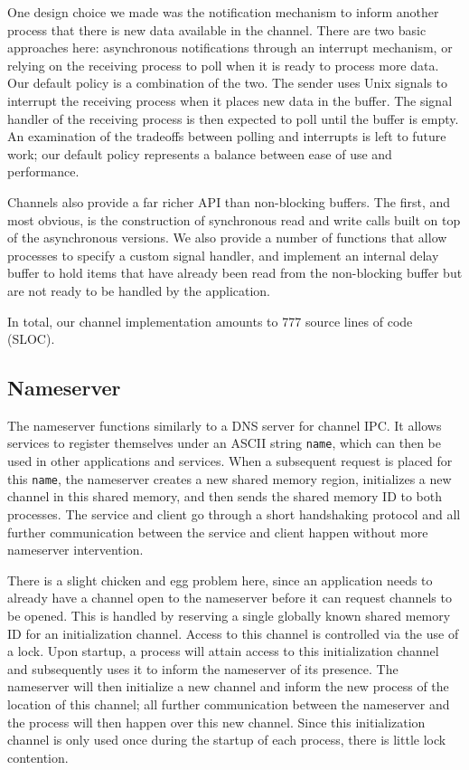 \documentclass[letterpaper,twocolumn,11pt]{article}
\begin{document}
One design choice we made was the notification mechanism to inform another process that there is new data available in the channel. There are two basic approaches here: asynchronous notifications through an interrupt mechanism, or relying on the receiving process to poll when it is ready to process more data. Our default policy is a combination of the two. The sender uses Unix signals to interrupt the receiving process when it places new data in the buffer. The signal handler of the receiving process is then expected to poll until the buffer is empty. An examination of the tradeoffs between polling and interrupts is left to future work; our default policy represents a balance between ease of use and performance.

Channels also provide a far richer API than non-blocking buffers. The first, and most obvious, is the construction of synchronous read and write calls built on top of the asynchronous versions. We also provide a number of functions that allow processes to specify a custom signal handler, and implement an internal delay buffer to hold items that have already been read from the non-blocking buffer but are not ready to be handled by the application.

In total, our channel implementation amounts to 777 source lines of code (SLOC).

\subsection{Nameserver}
The nameserver functions similarly to a DNS server for channel IPC. It allows services to register themselves under an ASCII string {\tt name}, which can then be used in other applications and services. When a subsequent request is placed for this {\tt name}, the nameserver creates a new shared memory region, initializes a new channel in this shared memory, and then sends the shared memory ID to both processes. The service and client go through a short handshaking protocol and all further communication between the service and client happen without more nameserver intervention.

There is a slight chicken and egg problem here, since an application needs to already have a channel open to the nameserver before it can request channels to be opened. This is handled by reserving a single globally known shared memory ID for an initialization channel. Access to this channel is controlled via the use of a lock. Upon startup, a process will attain access to this initialization channel and subsequently uses it to inform the nameserver of its presence. The nameserver will then initialize a new channel and inform the new process of the location of this channel; all further communication between the nameserver and the process will then happen over this new channel. Since this initialization channel is only used once during the startup of each process, there is little lock contention.
\end{document}
